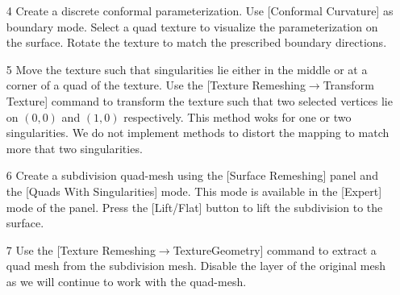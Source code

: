 \documentclass[Thesis.tex]{subfiles}
\begin{document}
\begin{itemize}
\item[4] Create a discrete conformal parameterization. Use [Conformal Curvature] as boundary mode. Select a quad texture to visualize the parameterization on the surface. Rotate the texture to match the prescribed boundary directions.
\item[5] Move the texture such that singularities lie either in the middle or at a corner of a quad of the texture. Use the [Texture Remeshing$\to$Transform Texture] command to transform the texture such that two selected vertices lie on $(0,0)$ and $(1,0)$ respectively. This method woks for one or two singularities. We do not implement methods to distort the mapping to match more that two singularities.

\begin{center}
\begin{minipage}{0.9\linewidth}
            \centering
\end{minipage}
\end{center}     
            
\item[6] Create a subdivision quad-mesh using the [Surface Remeshing] panel and the [Quads With Singularities] mode. This mode is available in the [Expert] mode of the panel. Press the [Lift/Flat] button to lift the subdivision to the surface.
\item[7] Use the [Texture Remeshing$\to$TextureGeometry] command to extract a quad mesh from the subdivision mesh. Disable the layer of the original mesh as we will continue to work with the quad-mesh.

\begin{center}
\begin{minipage}{0.9\linewidth}
            \centering
\end{minipage}
\end{center}                 
            

\end{itemize}
\end{document}
